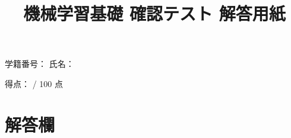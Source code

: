 \documentclass[uplatex,a4paper,12pt]{jsarticle}
\begin{document}
\title{機械学習基礎 確認テスト 解答用紙}
\author{}
\date{}
\maketitle

\noindent
学籍番号：\underline{\hspace{5cm}} \hfill
氏名：\underline{\hspace{5cm}}

\vspace{5mm}

\noindent
得点：\underline{\hspace{3cm}} / 100 点

\vspace{8mm}

\section*{解答欄}
\end{document}
